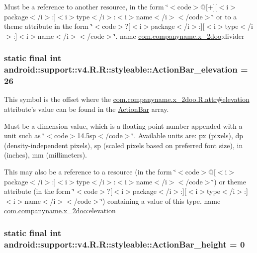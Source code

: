 Must be a reference to another resource, in the form \char`\"{}$<$code$>$@\mbox{[}+\mbox{]}\mbox{[}$<$i$>$package$<$/i$>$:\mbox{]}$<$i$>$type$<$/i$>$:$<$i$>$name$<$/i$>$$<$/code$>$\char`\"{} or to a theme attribute in the form \char`\"{}$<$code$>$?\mbox{[}$<$i$>$package$<$/i$>$:\mbox{]}\mbox{[}$<$i$>$type$<$/i$>$:\mbox{]}$<$i$>$name$<$/i$>$$<$/code$>$\char`\"{}.  name \hyperlink{namespacecom_1_1companyname_1_1x__2doo}{com.companyname.x\_\-2doo}:divider \hypertarget{classandroid_1_1support_1_1v4_1_1_r_1_1styleable_0516184b1cd0e4ef27327318c1bdc7c4}{
\subsubsection[{ActionBar\_\-elevation}]{\setlength{\rightskip}{0pt plus 5cm}static final int android::support::v4.R.R::styleable::ActionBar\_\-elevation = 26}}
\label{classandroid_1_1support_1_1v4_1_1_r_1_1styleable_0516184b1cd0e4ef27327318c1bdc7c4}


This symbol is the offset where the \hyperlink{classcom_1_1companyname_1_1x__2doo_1_1_r_1_1attr_3661b6445a2b19a2dca2157df91648d2}{com.companyname.x\_\-2doo.R.attr\#elevation} attribute's value can be found in the \hyperlink{classandroid_1_1support_1_1v4_1_1_r_1_1styleable_5c6cf2c83551ebae05f365bb913fdddf}{ActionBar} array.

Must be a dimension value, which is a floating point number appended with a unit such as \char`\"{}$<$code$>$14.5sp$<$/code$>$\char`\"{}. Available units are: px (pixels), dp (density-independent pixels), sp (scaled pixels based on preferred font size), in (inches), mm (millimeters). 

This may also be a reference to a resource (in the form \char`\"{}$<$code$>$@\mbox{[}$<$i$>$package$<$/i$>$:\mbox{]}$<$i$>$type$<$/i$>$:$<$i$>$name$<$/i$>$$<$/code$>$\char`\"{}) or theme attribute (in the form \char`\"{}$<$code$>$?\mbox{[}$<$i$>$package$<$/i$>$:\mbox{]}\mbox{[}$<$i$>$type$<$/i$>$:\mbox{]}$<$i$>$name$<$/i$>$$<$/code$>$\char`\"{}) containing a value of this type.  name \hyperlink{namespacecom_1_1companyname_1_1x__2doo}{com.companyname.x\_\-2doo}:elevation \hypertarget{classandroid_1_1support_1_1v4_1_1_r_1_1styleable_e9d68fc513f852dd01e0da8392efa4d1}{
\subsubsection[{ActionBar\_\-height}]{\setlength{\rightskip}{0pt plus 5cm}static final int android::support::v4.R.R::styleable::ActionBar\_\-height = 0}}
\label{classandroid_1_1support_1_1v4_1_1_r_1_1styleable_e9d68fc513f852dd01e0da8392efa4d1}



